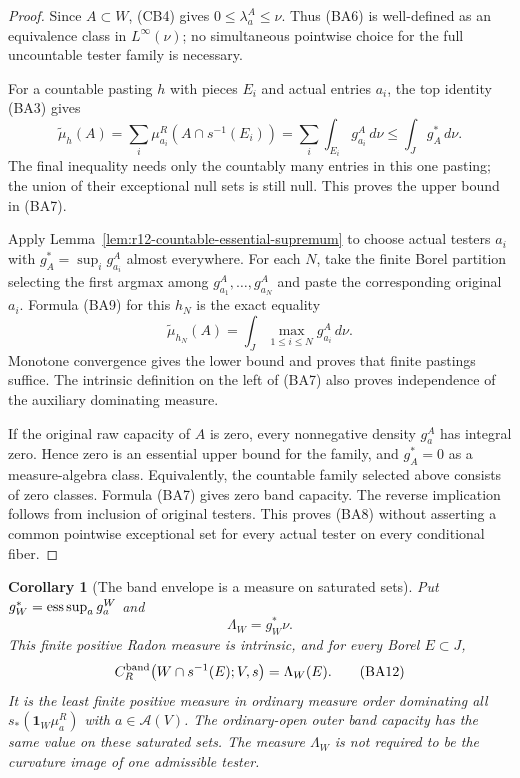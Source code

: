 \documentclass[11pt,a4paper]{article}
\numberwithin{equation}{section}
\newtheorem{corollary}[theorem]{Corollary}
\theoremstyle{definition}
\theoremstyle{remark}
\begin{document}
\begin{proof}
Since $A\subset W$, (CB4) gives $0\leq\lambda_a^A\leq\nu$.
Thus (BA6) is well-defined as an equivalence class in
$L^\infty(\nu)$; no simultaneous pointwise choice for the full
uncountable tester family is necessary.

For a countable pasting $h$ with pieces $E_i$ and actual entries
$a_i$, the top identity (BA3) gives
\[
 \widetilde\mu_h(A)
    =\sum_i\mu^R_{a_i}(A\cap s^{-1}(E_i))
    =\sum_i\int_{E_i}g_{a_i}^A\,d\nu
    \leq\int_Jg_A^*\,d\nu.
 \tag{BA9}
\]
The final inequality needs only the countably many entries in
this one pasting; the union of their exceptional null sets is
still null. This proves the upper bound in (BA7).

Apply Lemma~\ref{lem:r12-countable-essential-supremum} to choose
actual testers $a_i$ with $g_A^*=\sup_i g_{a_i}^A$ almost
everywhere. For each $N$, take the finite Borel partition
selecting the first argmax among $g_{a_1}^A,\ldots,g_{a_N}^A$
and paste the corresponding original $a_i$. Formula (BA9) for
this $h_N$ is the exact equality
\[
                   \widetilde\mu_{h_N}(A)
                        =\int_J\max_{1\leq i\leq N}g_{a_i}^A\,d\nu.
 \tag{BA10}
\]
Monotone convergence gives the lower bound and proves that finite
pastings suffice. The intrinsic definition on the left of (BA7)
also proves independence of the auxiliary dominating measure.

If the original raw capacity of $A$ is zero, every nonnegative
density $g_a^A$ has integral zero. Hence zero is an essential
upper bound for the family, and $g_A^*=0$ as a measure-algebra
class. Equivalently, the countable family selected above consists
of zero classes. Formula (BA7) gives zero band capacity. The
reverse implication follows from inclusion of original testers.
This proves (BA8) without asserting a common pointwise exceptional
set for every actual tester on every conditional fiber.
\end{proof}

\begin{corollary}[The band envelope is a measure on saturated sets]
\label{cor:r12-band-capacity-measure-envelope}
Put $g_W^*=\mathop{\rm ess\,sup}_a g_a^W$ and
\[
                              \Lambda_W=g_W^*\nu.
 \tag{BA11}
\]
This finite positive Radon measure is intrinsic, and for every
Borel $E\subset J$,
\[
         C_R^{\rm band}\bigl(W\cap s^{-1}(E);V,s\bigr)
                                      =\Lambda_W(E).
 \tag{BA12}
\]
It is the least finite positive measure in ordinary measure order dominating
all $s_*(\mathbf1_W\mu^R_a)$ with $a\in\mathcal A(V)$.
The ordinary-open outer band capacity has the same value on
these saturated sets. The measure $\Lambda_W$ is not required
to be the curvature image of one admissible tester.
\end{corollary}
\end{document}
